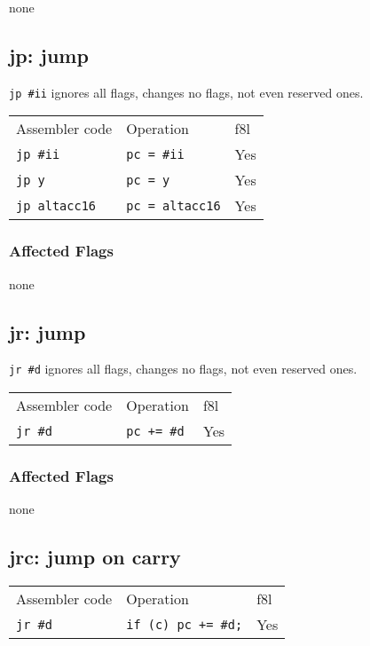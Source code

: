 \documentclass{book}
\begin{document}
none


\subsection{jp: jump}

\texttt{jp \#ii} ignores all flags, changes no flags, not even reserved ones.

\begin{tabular}{l l l}
Assembler code       & Operation              & f8l \\
\texttt{jp \#ii}     & \texttt{pc = \#ii}     & Yes \\
\texttt{jp y}        & \texttt{pc = y}        & Yes \\
\texttt{jp altacc16} & \texttt{pc = altacc16} & Yes \\
\end{tabular}

\subsubsection*{Affected Flags}

none

\subsection{jr: jump}

\texttt{jr \#d} ignores all flags, changes no flags, not even reserved ones.

\begin{tabular}{l l l}
Assembler code  & Operation          & f8l \\
\texttt{jr \#d} & \texttt{pc += \#d} & Yes \\
\end{tabular}

\subsubsection*{Affected Flags}

none


\subsection{jrc: jump on carry}

\begin{tabular}{l l l}
Assembler code  & Operation                  & f8l \\
\texttt{jr \#d} & \texttt{if (c) pc += \#d;} & Yes \\
\end{tabular}
\end{document}
